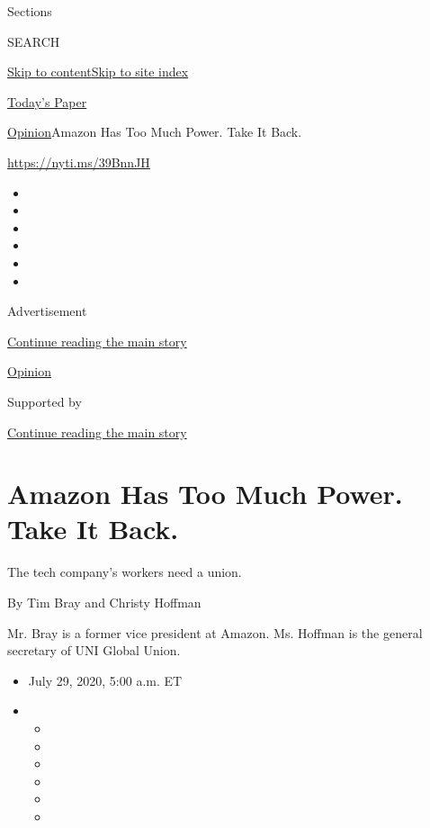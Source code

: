 Sections

SEARCH

\protect\hyperlink{site-content}{Skip to
content}\protect\hyperlink{site-index}{Skip to site index}

\href{https://myaccount.nytimes3xbfgragh.onion/auth/login?response_type=cookie\&client_id=vi}{}

\href{https://www.nytimes3xbfgragh.onion/section/todayspaper}{Today's
Paper}

\href{/section/opinion}{Opinion}\textbar{}Amazon Has Too Much Power.
Take It Back.

\url{https://nyti.ms/39BnnJH}

\begin{itemize}
\item
\item
\item
\item
\item
\item
\end{itemize}

Advertisement

\protect\hyperlink{after-top}{Continue reading the main story}

\href{/section/opinion}{Opinion}

Supported by

\protect\hyperlink{after-sponsor}{Continue reading the main story}

\hypertarget{amazon-has-too-much-power-take-it-back}{%
\section{Amazon Has Too Much Power. Take It
Back.}\label{amazon-has-too-much-power-take-it-back}}

The tech company's workers need a union.

By Tim Bray and Christy Hoffman

Mr. Bray is a former vice president at Amazon. Ms. Hoffman is the
general secretary of UNI Global Union.

\begin{itemize}
\item
  July 29, 2020, 5:00 a.m. ET
\item
  \begin{itemize}
  \item
  \item
  \item
  \item
  \item
  \item
  \end{itemize}
\end{itemize}

